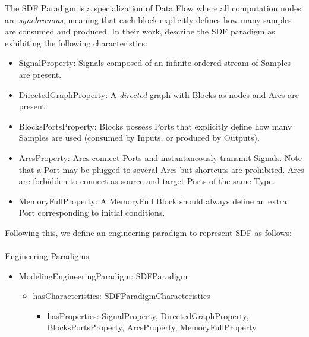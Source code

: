 The SDF Paradigm \cite{J:Lee-Messerschmitt:1987} is a specialization of Data Flow where all computation nodes are \emph{synchronous}, meaning that each block explicitly defines how many samples are consumed and produced. In their work, \cite{Amrani2020} describe the SDF paradigm as exhibiting the following characteristics:

\begin{itemize}
    \item SignalProperty: \textsf{Signal}s composed of an infinite ordered stream of \textsf{Sample}s are present.
   
   \item DirectedGraphProperty: A \emph{directed} graph with \textsf{Block}s as nodes and \textsf{Arc}s are present. 
   
   \item BlocksPortsProperty: \textsf{Block}s possess \textsf{Port}s that explicitly define how many
   \textsf{Sample}s are used (consumed by \textsf{Input}s, or produced by 
   \textsf{Output}s).

   \item ArcsProperty: \textsf{Arc}s connect \textsf{Port}s and instantaneously transmit \textsf{Signal}s. Note that a \textsf{Port} may be plugged to several \textsf{Arc}s but \textsf{shortcuts} are prohibited.
   \textsf \textsf{Arc}s are forbidden to connect as source and target \textsf{Port}s of the same \textsf{Type}.
   
   \item MemoryFullProperty: A \textsf{MemoryFull} \textsf{Block} should always define an extra \textsf{Port} corresponding to initial conditions. 
\end{itemize}

Following this, we define an engineering paradigm to represent SDF as follows:
\\
\\
\noindent\uline{Engineering Paradigms}
\begin{itemize}
    \item ModelingEngineeringParadigm: SDFParadigm
    \begin{itemize}
        \item hasCharacteristics: SDFParadigmCharacteristics
        \begin{itemize}
            \item hasProperties: SignalProperty, DirectedGraphProperty, BlocksPortsProperty, ArcsProperty, MemoryFullProperty
        \end{itemize}
    \end{itemize}
\end{itemize}

